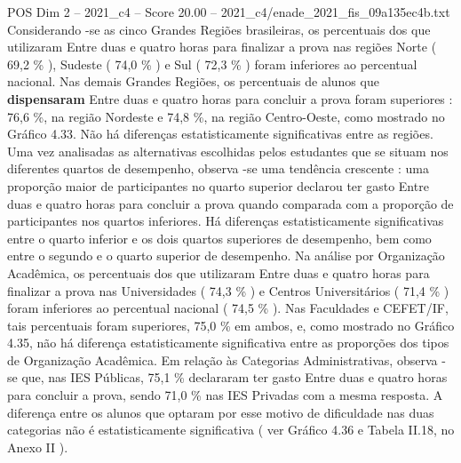 \begin{textsample}{POS Dim 2 – 2021\_c4 – Score 20.00 – 2021\_c4/enade\_2021\_fis\_09a135ec4b.txt}
Considerando -se as cinco Grandes Regiões brasileiras, os percentuais dos que utilizaram Entre duas e quatro horas para finalizar a prova nas regiões Norte ( 69,2 \% ), Sudeste ( 74,0 \% ) e Sul ( 72,3 \% ) foram inferiores ao percentual nacional.
Nas demais Grandes Regiões, os percentuais de alunos que \textbf{dispensaram} Entre duas e quatro horas para concluir a prova foram superiores : 76,6 \%, na região Nordeste e 74,8 \%, na região Centro-Oeste, como mostrado no Gráfico 4.33.
Não há diferenças estatisticamente significativas entre as regiões.
Uma vez analisadas as alternativas escolhidas pelos estudantes que se situam nos diferentes quartos de desempenho, observa -se uma tendência crescente : uma proporção maior de participantes no quarto superior declarou ter gasto Entre duas e quatro horas para concluir a prova quando comparada com a proporção de participantes nos quartos inferiores.
Há diferenças estatisticamente significativas entre o quarto inferior e os dois quartos superiores de desempenho, bem como entre o segundo e o quarto superior de desempenho.
Na análise por Organização Acadêmica, os percentuais dos que utilizaram Entre duas e quatro horas para finalizar a prova nas Universidades ( 74,3 \% ) e Centros Universitários ( 71,4 \% ) foram inferiores ao percentual nacional ( 74,5 \% ).
Nas Faculdades e CEFET/IF, tais percentuais foram superiores, 75,0 \% em ambos, e, como mostrado no Gráfico 4.35, não há diferença estatisticamente significativa entre as proporções dos tipos de Organização Acadêmica.
Em relação às Categorias Administrativas, observa -se que, nas IES Públicas, 75,1 \% declararam ter gasto Entre duas e quatro horas para concluir a prova, sendo 71,0 \% nas IES Privadas com a mesma resposta.
A diferença entre os alunos que optaram por esse motivo de dificuldade nas duas categorias não é estatisticamente significativa ( ver Gráfico 4.36 e Tabela II.18, no Anexo II ).

\end{textsample}

